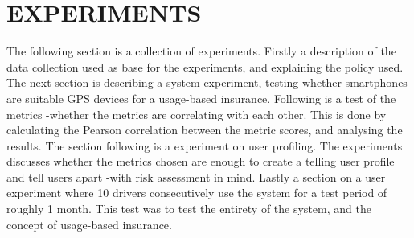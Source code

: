 \section{EXPERIMENTS}\label{sec:experiments}

The following section is a collection of experiments. Firstly a description of the data collection used as base for the experiments, and explaining the policy used. The next section is describing a system experiment, testing whether smartphones are suitable GPS devices for a usage-based insurance. Following is a test of the metrics -whether the metrics are correlating with each other. This is done by calculating the Pearson correlation between the metric scores, and analysing the results. The section following is a experiment on user profiling. The experiments discusses whether the metrics chosen are enough to create a telling user profile and tell users apart -with risk assessment in mind. Lastly a section on a user experiment where 10 drivers consecutively use the system for a test period of roughly 1 month. This test was to test the entirety of the system, and the concept of usage-based insurance.




